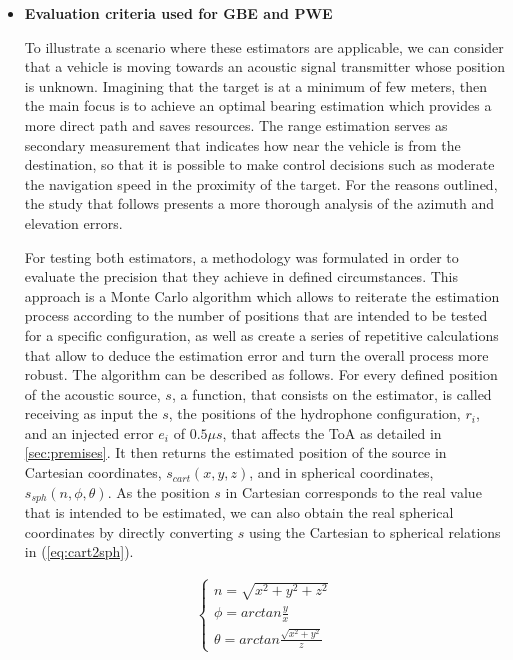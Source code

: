\begin{itemize}
	\item \textbf{Evaluation criteria used for GBE and PWE}
	
	To illustrate a scenario where these estimators are applicable, we can consider that a vehicle is moving towards an acoustic signal transmitter whose position is unknown. Imagining that the target is at a minimum of few meters, then the main focus is to achieve an optimal bearing estimation which provides a more direct path and saves resources. The range estimation serves as secondary measurement that indicates how near the vehicle is from the destination, so that it is possible to make control decisions such as moderate the navigation speed in the proximity of the target. For the reasons outlined, the study that follows presents a more thorough analysis of the azimuth and elevation errors. 
	
	For testing both estimators, a methodology was formulated in order to evaluate the precision that they achieve in defined circumstances. This approach is a Monte Carlo algorithm which allows to reiterate the estimation process according to the number of positions that are intended to be tested for a specific configuration, as well as create a series of repetitive calculations that allow to deduce the estimation error and turn the overall process more robust.
	The algorithm can be described as follows. For every defined position of the acoustic source, $s$, a function, that consists on the estimator, is called receiving as input the $s$, the positions of the hydrophone configuration, $r_i$, and an injected error $e_i$ of $0.5 \mu s$, that affects the ToA as detailed in \ref{sec:premises}. It then returns the estimated position of the source in Cartesian coordinates, $s_{cart}(x,y,z)$, and in spherical coordinates, $s_{sph}(n, \phi, \theta)$. As the position $s$ in Cartesian corresponds to the real value that is intended to be estimated, we can also obtain the real spherical coordinates by directly converting $s$ using the Cartesian to spherical relations in (\ref{eq:cart2sph}).
	
	\begin{eqnarray}
		\begin{cases} 
			n =  \sqrt{x^2 + y^2 + z^2}\\ 
			\phi  = arctan \frac{y}{x}\\ 
			\theta =  arctan \frac{\sqrt{x^2+y^2}}{z}
		\end{cases}
		\label{eq:cart2sph}
	\end{eqnarray}
	

\end{itemize}
